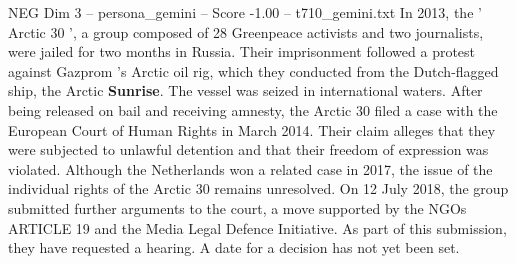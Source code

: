 \begin{textsample}{NEG Dim 3 – persona\_gemini – Score -1.00 – t710\_gemini.txt}  \label{ex:f3_neg_006}
In 2013, the ' Arctic 30 ', a group composed of 28 Greenpeace activists and two journalists, were jailed for two months in Russia.
Their imprisonment followed a protest against Gazprom 's Arctic oil rig, which they conducted from the Dutch-flagged ship, the Arctic \textbf{Sunrise}.
The vessel was seized in international waters.
After being released on bail and receiving amnesty, the Arctic 30 filed a case with the European Court of Human Rights in March 2014.
Their claim alleges that they were subjected to unlawful detention and that their freedom of expression was violated.
Although the Netherlands won a related case in 2017, the issue of the individual rights of the Arctic 30 remains unresolved.
On 12 July 2018, the group submitted further arguments to the court, a move supported by the NGOs ARTICLE 19 and the Media Legal Defence Initiative.
As part of this submission, they have requested a hearing.
A date for a decision has not yet been set.

\end{textsample}
